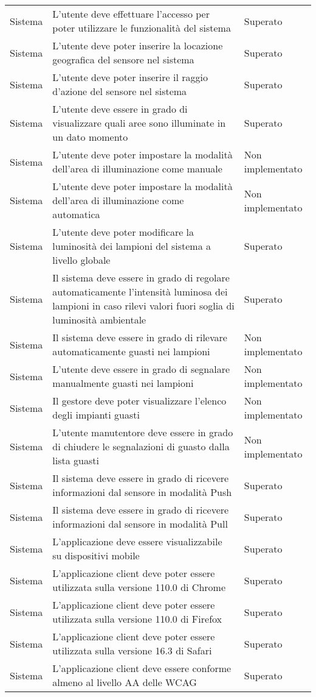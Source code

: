 \begin{center}
\begin{xltabular}{\linewidth}{|l|X|l|}
        Sistema & L'utente deve effettuare l'accesso per poter utilizzare le funzionalità del sistema & Superato\\
        Sistema & L'utente deve poter inserire la locazione geografica del sensore nel sistema & Superato\\
        Sistema & L'utente deve poter inserire il raggio d'azione del sensore nel sistema & Superato\\
        Sistema & L'utente deve essere in grado di visualizzare quali aree sono illuminate in un dato momento & Superato\\
        Sistema & L'utente deve poter impostare la modalità dell'area di illuminazione come manuale & Non implementato\\
        Sistema & L'utente deve poter impostare la modalità dell'area di illuminazione come automatica & Non implementato\\
        Sistema & L'utente deve poter modificare la luminosità dei lampioni del sistema a livello globale & Superato\\
        Sistema & Il sistema deve essere in grado di regolare automaticamente l'intensità luminosa dei lampioni in caso rilevi valori fuori soglia di luminosità ambientale & Superato\\
        Sistema & Il sistema deve essere in grado di rilevare automaticamente guasti nei lampioni & Non implementato\\
        Sistema & L'utente deve essere in grado di segnalare manualmente guasti nei lampioni & Non implementato\\
        Sistema & Il gestore deve poter visualizzare l'elenco degli impianti guasti & Non implementato\\
        Sistema & L'utente manutentore deve essere in grado di chiudere le segnalazioni di guasto dalla lista guasti & Non implementato\\
        Sistema & Il sistema deve essere in grado di ricevere informazioni dal sensore in modalità Push & Superato\\
        Sistema & Il sistema deve essere in grado di ricevere informazioni dal sensore in modalità Pull & Superato\\
        Sistema & L'applicazione deve essere visualizzabile su dispositivi mobile & Superato\\
        Sistema & L'applicazione client deve poter essere utilizzata sulla versione 110.0 di Chrome  & Superato\\
        Sistema & L'applicazione client deve poter essere utilizzata sulla versione 110.0 di Firefox  & Superato\\
        Sistema & L'applicazione client deve poter essere utilizzata sulla versione 16.3 di Safari  & Superato\\
        Sistema & L'applicazione client deve essere conforme almeno al livello AA delle WCAG  & Superato\\
    
        
        \hline
    \end{xltabular}
\end{center}

